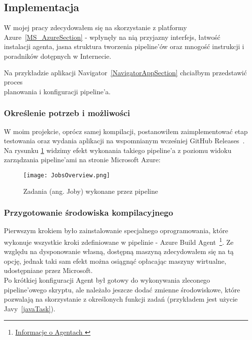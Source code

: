 \subsection{Implementacja}
W mojej pracy zdecydowałem się na skorzystanie z platformy Azure~\ref{MS_AzureSection} - 
wpłynęły na nią przyjazny interfejs, łatwość instalacji agenta, jasna struktura tworzenia pipeline'ów 
oraz mnogość instrukcji i poradników dotępnych w Internecie.

Na przykładzie aplikacji Navigator~\ref{NavigatorAppSection} chciałbym przedstawić proces \\
planowania i konfiguracji pipeline'a.

\subsubsection{Określenie potrzeb i możliwości}
W moim projekcie, oprócz samej kompilacji, postanowiłem zaimplementować etap testowania 
oraz wydania aplikacji na wspomnianym wcześniej GitHub Releases~\cite{githubReleases}.
Na rysunku \ref{img:JobsOverview} widzimy efekt wykonania takiego pipeline'a z poziomu 
widoku zarządzania pipeline'ami na stronie Microsoft Azure:

\begin{figure}[ht]
    \centering
    \texttt{[image: JobsOverview.png]}
    \caption{Zadania (ang. Joby) wykonane przez pipeline}
    \label{img:JobsOverview}
\end{figure}

\subsubsection{Przygotowanie środowiska kompilacyjnego}
Pierwszym krokiem było zainstalowanie specjalnego oprogramowania, 
które wykonuje wszystkie kroki zdefiniowane w pipelinie - Azure Build Agent~\footnote[1]{
    \href{https://learn.microsoft.com/en-us/azure/devops/pipelines/agents/agents}{
        Informacje o Agentach
    }
}.
Ze względu na dysponowanie własną, dostępną maszyną zdecydowałem się na tą opcję,
jednak taki sam efekt można osiągnąć opłacając maszyny wirtualne, udostępniane przez Microsoft. \\%
Po krótkiej konfiguracji Agent był gotowy do wykonywania zleconego \\%
pipeline'owego skryptu, ale należało jeszcze dodać zmienne środowiskowe, 
które pozwalają na skorzystanie z określonych funkcji zadań (przykładem jest użycie Javy~\ref{javaTask}).

